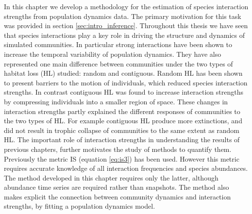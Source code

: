 In this chapter we develop a methodology for the estimation of species interaction strengths from population dynamics data. The primary motivation for this task was provided in section \ref{sec:intro_inference}. Throughout this thesis we have seen that species interactions play a key role in driving the structure and dynamics of simulated communities. In particular strong interactions have been shown to increase the temporal variability of population dynamics. They have also represented one main difference between communities under the two types of habitat loss (HL) studied: random and contiguous. Random HL has been shown to present barriers to the motion of individuals, which reduced species interaction strengths. In contrast contiguous HL was found to increase interaction strengths by compressing individuals into a smaller region of space. These changes in interaction strengths partly explained the different responses of communities to the two types of HL. For example contiguous HL produce more extinctions, and did not result in trophic collapse of communities to the same extent as random HL. The important role of interaction strengths in understanding the results of previous chapters, further motivates the study of methods to quantify them. Previously the metric IS (equation \eqref{eq:is3}) has been used. However this metric requires accurate knowledge of all interaction frequencies and species abundances. The method developed in this chapter requires only the latter, although abundance time series are required rather than snapshots. The method also makes explicit the connection between community dynamics and interaction strengths, by fitting a population dynamics model.   



